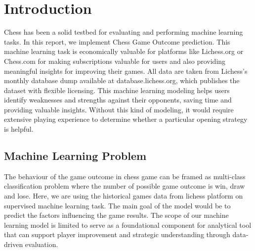 \chapter{Introduction}
\label{ch:introduction}

Chess has been a solid testbed for evaluating and performing machine learning tasks. In this report, we implement Chess Game Outcome prediction. This machine learning task is economically valuable for platforms like Lichess.org or Chess.com for making subscriptions valuable for users and also providing meaningful insights for improving their games. All data are taken from Lichess's monthly database dump available at database.lichess.org, which publishes the dataset with flexible licensing. This machine learning modeling helps users identify weaknesses and strengths against their opponents, saving time and providing valuable insights. Without this kind of modeling, it would require extensive playing experience to determine whether a particular opening strategy is helpful.

\section{Machine Learning Problem}
\label{sec:objective}
The behaviour of the game outcome in chess game can be framed as multi-class classification problem where the number of possible game outcome is win, draw and lose. Here, we are using the historical games data from lichess platform on supervised machine learning task. The main goal of the model would be to predict the factors influencing the game results. The scope of our machine learning model is limited to serve as a foundational component for analytical tool that can support player improvement and strategic understanding through data-driven evaluation.





